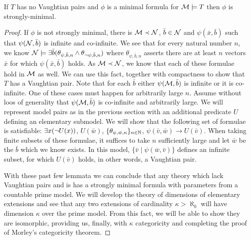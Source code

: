 \begin{lemma}\label{lemma_minimal_vaughtian_pair}
If \(T\) has no Vaughtian pairs and \(\phi\) is a minimal formula for \(\mathcal{M} \models T\) then \(\phi\) is strongly-minimal. 
\end{lemma}

\begin{proof}
If \(\phi\) is not strongly minimal, there is \(\mathcal{M} \prec \mathcal{N}\), \(\bar{b} \in \mathcal{N}\) and \(\psi(\bar{x}, \bar{b})\) such that \(\psi(\mathcal{N}, \bar{b})\) is infinite and co-infinite. 
We see that for every natural number \(n\), we know \(\mathcal{N} \models \exists \bar{b} (\theta_{\psi, \bar{b}, n} \land \theta_{\neg \psi, \bar{b}, n})\) where \(\theta_{\psi, \bar{b},n}\) asserts there are at least \(n\) vectors \(\bar{x}\) for which \(\psi(\bar{x}, \bar{b})\) holds. 
As \(\mathcal{M} \prec \mathcal{N}\), we know that each of these formulae hold in \(\mathcal{M}\) as well. 
We can use this fact, together with compactness to show that \(T\) has a Vaughtian pair.
Note that for each \(\bar{b}\) either \(\psi(\mathcal{M}, \bar{b})\) is infinite or it is co-infinite. 
One of these cases must happen for arbitrarily large \(n\).  %
Assume without loos of generality that \(\psi(\mathcal{M}, \bar{b})\) is co-infinite and arbitrarily large. 
We will represent model pairs as in the previous section with an additional predicate \(U\) defining an elementary submodel. 
We will show that the following set of formulae is satisfiable: 
\(\exists x (\neg U(x))\), \(U(\bar{w})\), \(\{\theta_{\psi, \bar{w}, n}\}_{n\in \mathbb{N}}\), \(\psi(\bar{v}, \bar{w}) \to U(\bar{v})\). 
When taking finite subsets of these formulae, it suffices to take \(n\) sufficiently large and let \(\bar{w}\) be the \(\bar{b}\) which we know exists.
In this model, \(\{\bar{v}\mid\psi(\bar{w}, \bar{v})\}\) defines an infinite subset, for which \(U(\bar{v})\) holds, in other words, a Vaughtian pair. %

With these past few lemmata we can conclude that any theory which lack Vaughtian pairs and is \omst has a strongly minimal formula with parameters from a countable prime model. 
We will develop the theory of dimensions of elementary extensions and see that any two extensions of cardinality \(\kappa > \aleph_0\) will have dimension \(\kappa\) over the prime model.
From this fact, we will be able to show they are isomorphic, providing us, finally, with \(\kappa\) categoricity and completing the proof of Morley's categoricity theorem. 
\end{proof}

